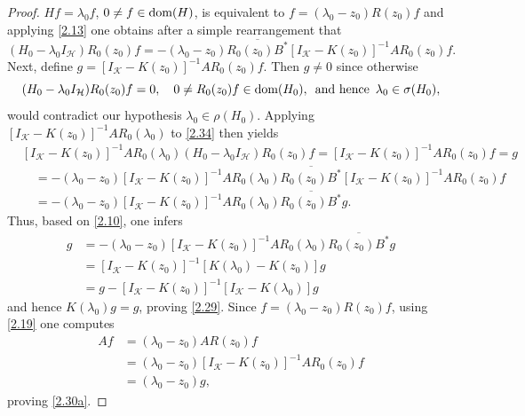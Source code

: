 \documentclass[reqno,10pt, centertags]{amsart}
\newcommand{\cH}{{\mathcal H}}
\newcommand{\cK}{{\mathcal K}}
\newcommand{\no}{\nonumber}
\newcommand{\lb}{\label}
\newcommand{\ol}{\overline}
\newcommand{\dom}{\text{\rm{dom}}}
\numberwithin{equation}{section}
\theoremstyle{definition}
\begin{document}
\begin{proof}
$Hf=\lambda_0f$, $0\neq f\in\dom(H)$, is equivalent to
$f=(\lambda_0-z_0)R(z_0)f$ and applying \eqref{2.13} one obtains
after a simple rearrangement that
\begin{equation}
(H_0-\lambda_0I_{\cH})R_0(z_0)f=-(\lambda_0-z_0)\ol{R_0(z_0)B^*}
[I_{\cK}-K(z_0)]^{-1}AR_0(z_0)f. \lb{2.34}
\end{equation}
Next, define $g=[I_{\cK}-K(z_0)]^{-1}AR_0(z_0)f$. Then $g\neq 0$
since otherwise
\begin{equation}
(H_0-\lambda_0 I_{\cH})R_0(z_0)f=0, \quad 0 \neq R_0(z_0)f\in \dom(H_0),
\, \text{ and hence } \, \lambda_0\in\sigma(H_0), \lb{2.35}
\end{equation}
would contradict our hypothesis $\lambda_0\in\rho(H_0)$. Applying
$[I_{\cK}-K(z_0)]^{-1}AR_0(\lambda_0)$ to \eqref{2.34} then yields
\begin{align}
&[I_{\cK}-K(z_0)]^{-1}AR_0(\lambda_0)(H_0-\lambda_0 I_{\cH})R_0(z_0)f=
[I_{\cK}-K(z_0)]^{-1}AR_0(z_0)f=g \no \\
&\quad =-(\lambda_0-z_0)[I_{\cK}-K(z_0)]^{-1}AR_0(\lambda_0)
\ol{R_0(z_0)B^*}[I_{\cK}-K(z_0)]^{-1}AR_0(z_0)f \no \\
&\quad =-(\lambda_0-z_0)[I_{\cK}-K(z_0)]^{-1}AR_0(\lambda_0)
\ol{R_0(z_0)B^*}g.  \lb{2.36}
\end{align}
Thus, based on \eqref{2.10}, one infers
\begin{align}
g&=-(\lambda_0-z_0)[I_{\cK}-K(z_0)]^{-1}AR_0(\lambda_0)
\ol{R_0(z_0)B^*}g \no \\
&=[I_{\cK}-K(z_0)]^{-1}[K(\lambda_0)-K(z_0)]g \no \\
&=g-[I_{\cK}-K(z_0)]^{-1}[I_{\cK}-K(\lambda_0)]g \lb{2.37}
\end{align}
and hence $K(\lambda_0)g=g$, proving \eqref{2.29}. Since
$f=(\lambda_0-z_0)R(z_0)f$, using \eqref{2.19} one computes
\begin{align}
Af&=(\lambda_0-z_0)AR(z_0)f \no \\
&=(\lambda_0-z_0)[I_{\cK}-K(z_0)]^{-1}AR_0(z_0)f \no \\
&=(\lambda_0-z_0)g,  \lb{2.37a}
\end{align}
proving \eqref{2.30a}.


\end{proof}
\end{document}
